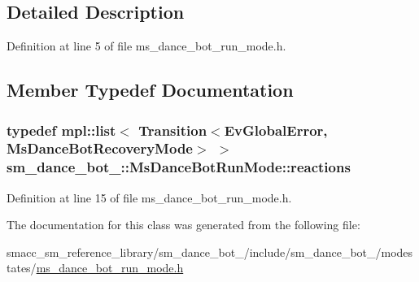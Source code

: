 \subsection{Detailed Description}


Definition at line 5 of file ms\+\_\+dance\+\_\+bot\+\_\+run\+\_\+mode.\+h.



\subsection{Member Typedef Documentation}
\subsubsection[{\texorpdfstring{reactions}{reactions}}]{\setlength{\rightskip}{0pt plus 5cm}typedef mpl\+::list$<$ Transition$<${\bf Ev\+Global\+Error}, {\bf Ms\+Dance\+Bot\+Recovery\+Mode}$>$ $>$ {\bf sm\+\_\+dance\+\_\+bot\+\_\+::\+Ms\+Dance\+Bot\+Run\+Mode\+::reactions}}\hypertarget{classsm__dance__bot__3_1_1MsDanceBotRunMode_a41bce655ae6002d347d430b255f5b727}{}\label{classsm__dance__bot__3_1_1MsDanceBotRunMode_a41bce655ae6002d347d430b255f5b727}


Definition at line 15 of file ms\+\_\+dance\+\_\+bot\+\_\+run\+\_\+mode.\+h.



The documentation for this class was generated from the following file\+:\begin{DoxyCompactItemize}
\item 
smacc\+\_\+sm\+\_\+reference\+\_\+library/sm\+\_\+dance\+\_\+bot\+\_/include/sm\+\_\+dance\+\_\+bot\+\_/modestates/\hyperlink{3_2include_2sm__dance__bot__3_2modestates_2ms__dance__bot__run__mode_8h}{ms\+\_\+dance\+\_\+bot\+\_\+run\+\_\+mode.\+h}\end{DoxyCompactItemize}
